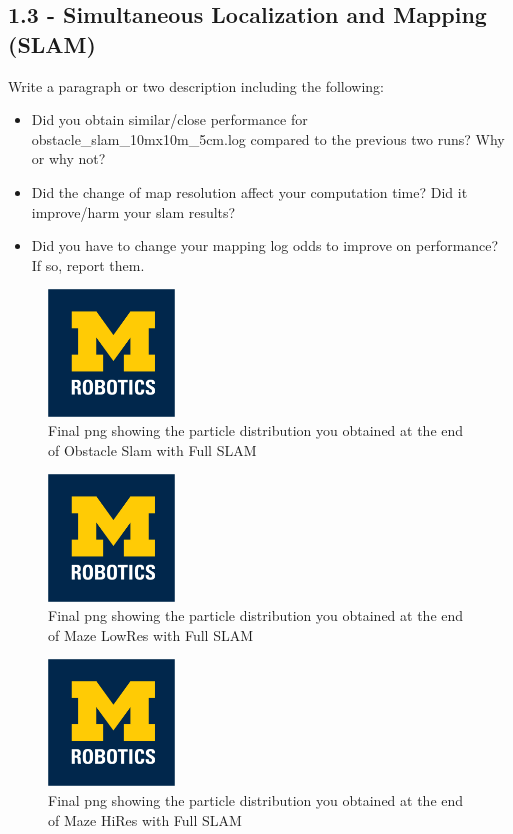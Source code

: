 \documentclass[journal,onecolumn]{IEEEtran}
\begin{document}
\subsection*{1.3 - Simultaneous Localization and Mapping (SLAM)} 

 Write a paragraph or two description including the following:
 \begin{itemize}
    \item Did you obtain similar/close performance for obstacle\_slam\_10mx10m\_5cm.log compared to the previous two runs? Why or why not?
    \item Did the change of map resolution affect your computation time? Did it improve/harm your slam results?
    \item Did you have to change your mapping log odds to improve on performance? If so, report them.
\end{itemize}

\begin{figure}[H]
\centering
\includegraphics[width=0.3\textwidth]{Media/template-robotics.jpg}
\caption{Final png showing the particle distribution you obtained at the end of Obstacle Slam with Full SLAM}
\end{figure}

\begin{figure}[H]
\centering
\includegraphics[width=0.3\textwidth]{Media/template-robotics.jpg}
\caption{Final png showing the particle distribution you obtained at the end of Maze LowRes with Full SLAM}
\end{figure}

\begin{figure}[H]
\centering
\includegraphics[width=0.3\textwidth]{Media/template-robotics.jpg}
\caption{Final png showing the particle distribution you obtained at the end of Maze HiRes with Full SLAM}
\end{figure}
\end{document}
